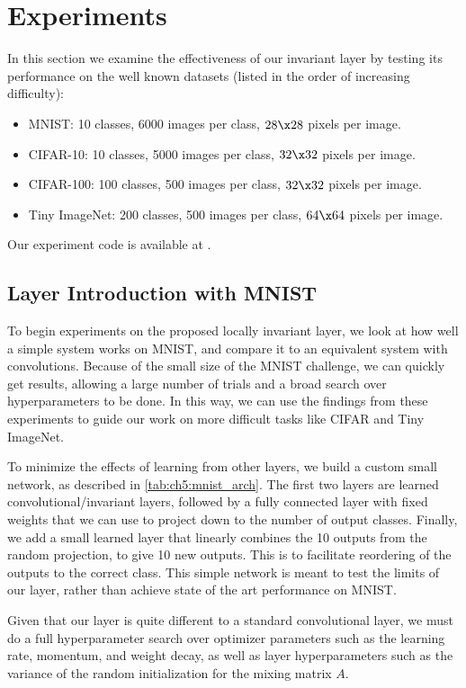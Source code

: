 \section{Experiments}\label{sec:ch5:experiments}
In this section we examine the effectiveness of our invariant layer by testing
its performance on the well known datasets (listed in the order of increasing
difficulty):
\begin{itemize}
  \item MNIST: 10 classes, 6000 images per class, $28\x 28$ pixels per image.
  \item CIFAR-10: 10 classes, 5000 images per class, $32\x 32$ pixels per image.
  \item CIFAR-100: 100 classes, 500 images per class, $32\x 32$ pixels per image. 
  \item Tiny ImageNet\cite{li_tiny_2017}: 200 classes, 500 images per class, 
    $64 \x 64$ pixels per image. 
\end{itemize}
Our experiment code is available at \cite{cotter_learnable_2019-1}.

\subsection{Layer Introduction with MNIST}\label{sec:ch5:mnist}
To begin experiments on the proposed locally invariant layer, we look at how
well a simple system works on MNIST, and compare it to an equivalent system with
convolutions. Because of the small size of the MNIST challenge, we can quickly
get results, allowing a large number of trials and a broad search over
hyperparameters to be done. In this way, we can use the findings from these
experiments to guide our work on more difficult tasks like CIFAR and Tiny
ImageNet.

To minimize the effects of learning from other layers, we build a
custom small network, as described in \autoref{tab:ch5:mnist_arch}. 
The first two layers are learned convolutional/invariant layers, followed by
a fully connected layer with fixed weights that we can use to project down to
the number of output classes. Finally, we add a small learned layer that
linearly combines the 10 outputs from the random projection, to give 10 new
outputs. This is to facilitate reordering of the outputs to the correct class.
This simple network is meant to test the limits of our layer, rather than
achieve state of the art performance on MNIST.

Given that our layer is quite different to a standard convolutional layer, we
must do a full hyperparameter search over optimizer parameters such as the
learning rate, momentum, and weight decay, as well as layer hyperparameters 
such as the variance of the random initialization for the mixing matrix $A$.

